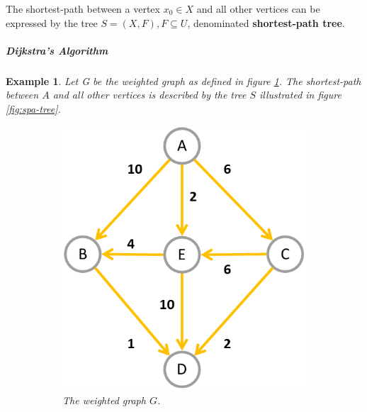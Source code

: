 \documentclass[12pt]{article}
\newtheorem{example}{Example}[section]
\begin{document}
The shortest-path between a vertex $x_0 \in X$ and all other vertices can be expressed by the tree $S=(X, F), F \subseteq U$, denominated \textbf{shortest-path tree}.

\subparagraph{Dijkstra's Algorithm \cite{cor2011}}

\begin{example}
	Let G be the weighted graph as defined in figure \ref{fig:spa-graph}. The shortest-path between $A$ and all other vertices is described by the tree $S$ illustrated in figure \ref{fig:spa-tree}.

	\begin{figure}[H]
		\centering
		\begin{subfigure}{.4\linewidth}
			\includegraphics[width=\linewidth]{spa-graph}
			\captionsetup{justification=centering}
			\caption{The weighted graph $G$.}
			\label{fig:spa-graph}
		\end{subfigure}
		\begin{subfigure}{.4\linewidth}

\end{subfigure}
\end{figure}
\end{example}
\end{document}
